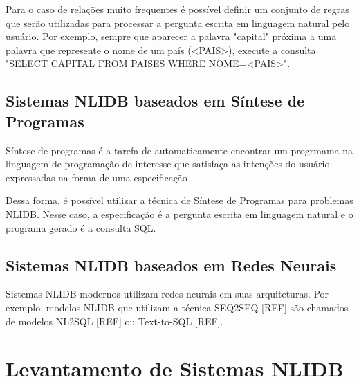 \documentclass{article}
\begin{document}
Para o caso de relações muito frequentes é possível definir um conjunto de regras que serão utilizadas para processar a pergunta escrita em linguagem natural pelo usuário. Por exemplo, sempre que aparecer a palavra "capital" próxima a uma palavra que represente o nome de um país (<PAIS>), execute a consulta "SELECT CAPITAL FROM PAISES WHERE NOME=<PAIS>".

\subsection{Sistemas NLIDB baseados em Síntese de Programas}





Síntese de programas é a tarefa de automaticamente encontrar um progrmama na linguagem de programação de interesse que satisfaça as intenções do usuário expressadas na forma de uma especificação \citep{gulwani2017program}.

Dessa forma, é possível utilizar a técnica de Síntese de Programas para problemas NLIDB. Nesse caso, a especificação é a pergunta escrita em linguagem natural e o programa gerado é a consulta SQL.

\subsection{Sistemas NLIDB baseados em Redes Neurais}

Sistemas NLIDB modernos utilizam redes neurais em suas arquiteturas. Por exemplo, modelos NLIDB que utilizam a técnica SEQ2SEQ [REF] são chamados de modelos NL2SQL [REF] ou Text-to-SQL [REF].


\section{Levantamento de Sistemas NLIDB\label{exemplosSistemasNLIDB}}
\end{document}
